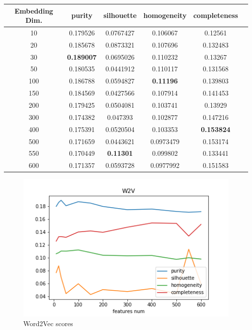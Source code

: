 \documentclass[11pt]{article}
\begin{document}
\begin{center}
\begin{tabular}{ |c|c|c|c|c|c| }
\hline
Embedding Dim.  & purity  & silhouette  & homogeneity  & completeness\\ \hline 
10  & 0.179526  & 0.0767427  & 0.106067  & 0.12561\\ \hline 
20  & 0.185678  & 0.0873321  & 0.107696  & 0.132483\\ \hline 
30  & \textbf{0.189007}  & 0.0695026  & 0.110232  & 0.13267\\ \hline 
50  & 0.180535  & 0.0441912  & 0.110117  & 0.131568\\ \hline 
100  & 0.186788  & 0.0594827  & \textbf{0.11196}  & 0.139803\\ \hline 
150  & 0.184569  & 0.0427566  & 0.107914  & 0.141453\\ \hline 
200  & 0.179425  & 0.0504081  & 0.103741  & 0.13929\\ \hline 
300  & 0.174382  & 0.047393  & 0.102877  & 0.147216\\ \hline 
400  & 0.175391  & 0.0520504  & 0.103353  & \textbf{0.153824}\\ \hline 
500  & 0.171659  & 0.0443621  & 0.0973479  & 0.153174\\ \hline 
550  & 0.170449  & \textbf{0.11301}  & 0.099802  & 0.133441\\ \hline 
600  & 0.171357  & 0.0593728  & 0.0977992  & 0.151583\\ \hline 
\end{tabular}
\end{center}
\FloatBarrier

\begin{figure}[h]
\centering
 	\includegraphics[scale=0.7]{w2v_scores.png}
	\caption{Word2Vec scores}
\label{w2v_scores}
\end{figure}
\FloatBarrier
\end{document}
